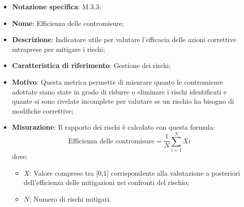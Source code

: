 \begin{itemize}
    \item \textbf{Notazione specifica}: M.3.3;
    \item \textbf{Nome}: Efficienza delle contromisure;
    \item \textbf{Descrizione}: Indicatore utile per valutare l'efficacia delle azioni correttive intraprese per mitigare i rischi;
    \item \textbf{Caratteristica di riferimento}: Gestione dei rischi;
    \item \textbf{Motivo}: Questa metrica permette di misurare quanto le contromisure adottate siano state in grado di ridurre o eliminare i rischi identificati e quante si sono rivelate incomplete per valutare se un rischio ha bisogno di modifiche correttive;
    \item \textbf{Misurazione}: Il rapporto dei rischi è calcolato con questa formula:
    \[
        \text{Efficienza delle contromisure} =\frac{1}{N} \sum_{i=1}^{N} Xi
    \]
    dove:
    \begin{itemize}
        \item $X$: Valore compreso tra [0,1] corrispondente alla valutazione a posteriori dell’efficienza delle mitigazioni nei confronti del rischio;
        \item $N$: Numero di rischi mitigati.
    \end{itemize}
\end{itemize}
